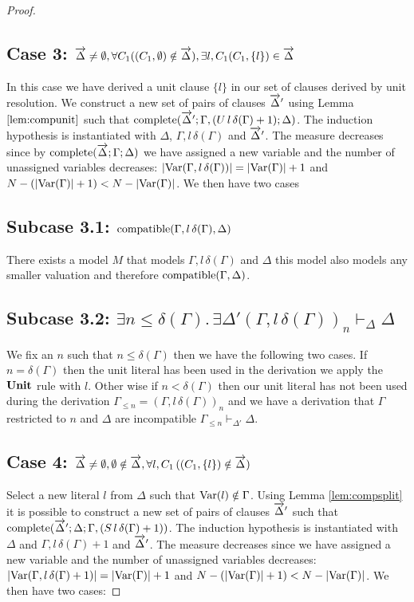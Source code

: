 \begin{mytheorem}
\begin{proof}
\subsection*{Case 3: $\overrightarrow{\Delta} \neq \emptyset, \forall C_1 ((C_1, \emptyset) \notin \overrightarrow{\Delta}), \exists l,C_1 (C_1 , \{ l \}) \in \overrightarrow{\Delta} $}
In this case we have derived a unit clause $\{ l \}$ in our set of clauses derived by unit resolution.  We construct a new set of pairs of clauses $\overrightarrow{\Delta}'$ using Lemma $\ref{lem:compunit}$ such that $\mathrm{complete}(\overrightarrow{\Delta}';\Gamma, (U \, l \, \delta(\Gamma) + 1); \Delta)$. 
%
The induction hypothesis is instantiated with $\Delta$, $\Gamma, l \, \delta(\Gamma)$ and $\overrightarrow{\Delta}'$. The measure decreases since by $\mathrm{complete}(\overrightarrow{\Delta};\Gamma; \Delta)$ we have assigned a new variable and the number of unassigned variables decreases: $ |\mathrm{Var}(\Gamma, l \, \delta(\Gamma))| = |\mathrm{Var}(\Gamma)| + 1$ and $N - (|\mathrm{Var}(\Gamma)| + 1) <  N - |\mathrm{Var}(\Gamma)|$.   We then have two cases 
%
\subsection*{Subcase 3.1: $\mathrm{compatible}(\Gamma, l \, \delta(\Gamma),\Delta)$}
There exists a model $M$ that models $\Gamma, l \, \delta(\Gamma)$ and $\Delta$ this model also models any smaller valuation and therefore $\mathrm{compatible}(\Gamma,\Delta)$.
\subsection*{Subcase 3.2: $\exists n \leq \delta(\Gamma). \, \exists \Delta' (\Gamma, l \, \delta(\Gamma))_n \vdash_{\Delta} \Delta$}
We fix an $n$ such that $n \leq \delta(\Gamma)$ then we have the following two cases. If $n = \delta(\Gamma)$ then the unit literal has been used in the derivation we apply the $\mathbf{Unit}$ rule with $l$. Other wise if $n < \delta(\Gamma)$ 
then our unit literal has not been used during the derivation $\Gamma_{\leq n} = (\Gamma, l \, \delta(\Gamma))_n$ and we have a derivation that $\Gamma$ restricted to $n$ and $\Delta$ are incompatible $\Gamma_{\leq n} \vdash_{\Delta'} \Delta$.
%
\subsection*{Case 4: $\overrightarrow{\Delta} \neq \emptyset, \emptyset \notin \overrightarrow{\Delta},  \forall l,C_1 \, ( (C_1 , \{ l \})  \notin \overrightarrow{\Delta} )$}
Select a new literal $l$ from $\Delta$ such that $\mathrm{Var}(l) \notin \Gamma$. Using Lemma \ref{lem:compsplit} it is possible to construct a new set of pairs of clauses $\overrightarrow{\Delta}'$ such that $\mathrm{complete}(\overrightarrow{\Delta}';\Delta; \Gamma, (S \, l \, \delta(\Gamma) + 1))$.
The induction hypothesis is instantiated with $\Delta$ and $ \Gamma, l \, \delta(\Gamma) + 1$ and $\overrightarrow{\Delta}'$. The measure decreases since we have assigned a new variable and the number of unassigned variables decreases: $ |\mathrm{Var}(\Gamma, l \, \delta(\Gamma) + 1)| = |\mathrm{Var}(\Gamma)| + 1$ and $N - (|\mathrm{Var}(\Gamma)| + 1) <  N - |\mathrm{Var}(\Gamma)|$.  We then have two cases:
%

\end{proof}
\end{mytheorem}
